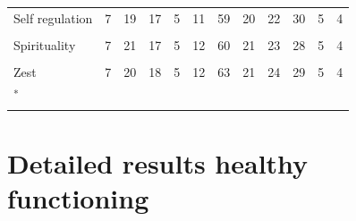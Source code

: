 \documentclass[
  letterpaper,
  DIV=11,
  numbers=noendperiod]{scrartcl}
\begin{document}
\begin{table}[H]
{\begin{tabular}[t]{llcccccccccc}
Self regulation & 7 & 19 & 17 & 5 & 11 & 59 & 20 & 22 & 30 & 5 & 4\\
\addlinespace
\cellcolor{gray!10}{Social intelligence} & \cellcolor{gray!10}{7} & \cellcolor{gray!10}{19} & \cellcolor{gray!10}{19} & \cellcolor{gray!10}{6} & \cellcolor{gray!10}{12} & \cellcolor{gray!10}{63} & \cellcolor{gray!10}{21} & \cellcolor{gray!10}{23} & \cellcolor{gray!10}{29} & \cellcolor{gray!10}{5} & \cellcolor{gray!10}{4}\\
Spirituality & 7 & 21 & 17 & 5 & 12 & 60 & 21 & 23 & 28 & 5 & 4\\
\cellcolor{gray!10}{Teamwork} & \cellcolor{gray!10}{7} & \cellcolor{gray!10}{18} & \cellcolor{gray!10}{18} & \cellcolor{gray!10}{5} & \cellcolor{gray!10}{11} & \cellcolor{gray!10}{60} & \cellcolor{gray!10}{20} & \cellcolor{gray!10}{22} & \cellcolor{gray!10}{28} & \cellcolor{gray!10}{5} & \cellcolor{gray!10}{4}\\
Zest & 7 & 20 & 18 & 5 & 12 & 63 & 21 & 24 & 29 & 5 & 4\\
\bottomrule
\multicolumn{12}{l}{\textsuperscript{*} }\\
\end{tabular}}
\end{table}

\newpage

\hypertarget{detailed-results-healthy-functioning}{%
\section{Detailed results healthy
functioning}\label{detailed-results-healthy-functioning}}
\end{document}
